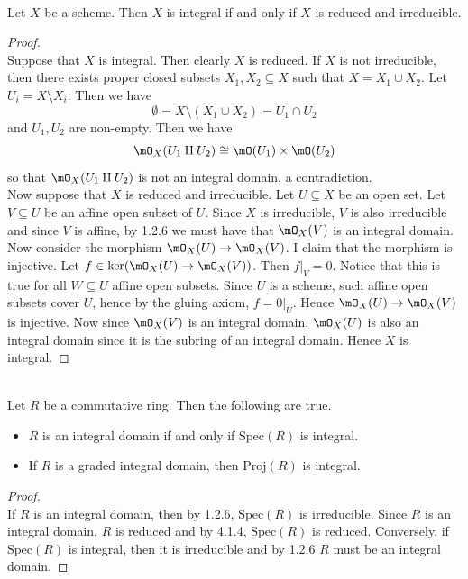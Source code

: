 \documentclass[a4paper]{article}
\begin{document}
\begin{prp}{}{}\\
Let $X$ be a scheme. Then $X$ is integral if and only if $X$ is reduced and irreducible. 
\begin{proof}\\
Suppose that $X$ is integral. Then clearly $X$ is reduced. If $X$ is not irreducible, then there exists proper closed subsets $X_1,X_2\subseteq X$ such that $X=X_1\cup X_2$. Let $U_i=X\setminus X_i$. Then we have $$\emptyset=X\setminus(X_1\cup X_2)=U_1\cap U_2$$ and $U_1,U_2$ are non-empty. Then we have $$\mO_X(U_1\amalg U_2)\cong\mO(U_1)\times\mO(U_2)$$ so that $\mO_X(U_1\amalg U_2)$ is not an integral domain, a contradiction. \\

Now suppose that $X$ is reduced and irreducible. Let $U\subseteq X$ be an open set. Let $V\subseteq U$ be an affine open subset of $U$. Since $X$ is irreducible, $V$ is also irreducible and since $V$ is affine, by 1.2.6 we must have that $\mO_X(V)$ is an integral domain. Now consider the morphism $\mO_X(U)\to\mO_X(V)$. I claim that the morphism is injective. Let $f\in\ker(\mO_X(U)\to\mO_X(V))$. Then $f|_V=0$. Notice that this is true for all $W\subseteq U$ affine open subsets. Since $U$ is a scheme, such affine open subsets cover $U$, hence by the gluing axiom, $f=0|_U$. Hence $\mO_X(U)\to\mO_X(V)$ is injective. Now since $\mO_X(V)$ is an integral domain, $\mO_X(U)$ is also an integral domain since it is the subring of an integral domain. Hence $X$ is integral. 
\end{proof}
\end{prp}

\begin{lmm}{}{}\\
Let $R$ be a commutative ring. Then the following are true. 
\begin{itemize}
\item $R$ is an integral domain if and only if $\text{Spec}(R)$ is integral. 
\item If $R$ is a graded integral domain, then $\text{Proj}(R)$ is integral. 
\end{itemize}
\begin{proof}\\
If $R$ is an integral domain, then by 1.2.6, $\text{Spec}(R)$ is irreducible. Since $R$ is an integral domain, $R$ is reduced and by 4.1.4, $\text{Spec}(R)$ is reduced. Conversely, if $\text{Spec}(R)$ is integral, then it is irreducible and by 1.2.6 $R$ must be an integral domain. 
\end{proof}
\end{lmm}
\end{document}
